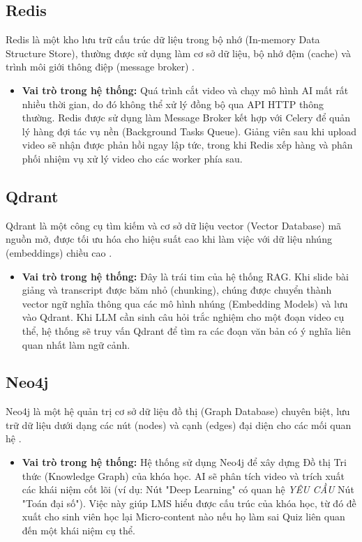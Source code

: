 \subsection{Redis}
Redis là một kho lưu trữ cấu trúc dữ liệu trong bộ nhớ (In-memory Data Structure Store), thường được sử dụng làm cơ sở dữ liệu, bộ nhớ đệm (cache) và trình môi giới thông điệp (message broker) \cite{carlson2013redis}.
\begin{itemize}
    \item \textbf{Vai trò trong hệ thống:} Quá trình cắt video và chạy mô hình AI mất rất nhiều thời gian, do đó không thể xử lý đồng bộ qua API HTTP thông thường. Redis được sử dụng làm Message Broker kết hợp với Celery để quản lý hàng đợi tác vụ nền (Background Tasks Queue). Giảng viên sau khi upload video sẽ nhận được phản hồi ngay lập tức, trong khi Redis xếp hàng và phân phối nhiệm vụ xử lý video cho các worker phía sau.
\end{itemize}

\subsection{Qdrant}
Qdrant là một công cụ tìm kiếm và cơ sở dữ liệu vector (Vector Database) mã nguồn mở, được tối ưu hóa cho hiệu suất cao khi làm việc với dữ liệu nhúng (embeddings) chiều cao \cite{qdrant2024}.
\begin{itemize}
    \item \textbf{Vai trò trong hệ thống:} Đây là trái tim của hệ thống RAG. Khi slide bài giảng và transcript được băm nhỏ (chunking), chúng được chuyển thành vector ngữ nghĩa thông qua các mô hình nhúng (Embedding Models) và lưu vào Qdrant. Khi LLM cần sinh câu hỏi trắc nghiệm cho một đoạn video cụ thể, hệ thống sẽ truy vấn Qdrant để tìm ra các đoạn văn bản có ý nghĩa liên quan nhất làm ngữ cảnh.
\end{itemize}

\subsection{Neo4j}
Neo4j là một hệ quản trị cơ sở dữ liệu đồ thị (Graph Database) chuyên biệt, lưu trữ dữ liệu dưới dạng các nút (nodes) và cạnh (edges) đại diện cho các mối quan hệ \cite{neo4j2024}.
\begin{itemize}
    \item \textbf{Vai trò trong hệ thống:} Hệ thống sử dụng Neo4j để xây dựng Đồ thị Tri thức (Knowledge Graph) của khóa học. AI sẽ phân tích video và trích xuất các khái niệm cốt lõi (ví dụ: Nút "Deep Learning" có quan hệ \textit{YÊU CẦU} Nút "Toán đại số"). Việc này giúp LMS hiểu được cấu trúc của khóa học, từ đó đề xuất cho sinh viên học lại Micro-content nào nếu họ làm sai Quiz liên quan đến một khái niệm cụ thể.
\end{itemize}

